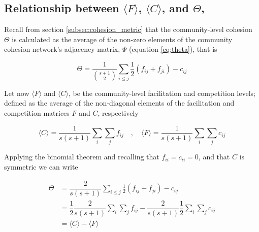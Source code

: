 \documentclass[titlepage,11pt]{article}
\begin{document}
	\subsection{Relationship between $ \langle F \rangle $, $ \langle C \rangle $, and $ \Theta $,}\label{subsec:relationships}
		Recall from section \ref{subsec:cohesion_metric} that the community-level cohesion $ \Theta $ is calculated as the average of the non-zero elements of the community cohesion network's adjacency matrix, $ \Psi $ (equation \ref{eq:theta}), that is
		\begin{linenomath*}
				\begin{equation}
					\Theta = \dfrac{1}{{s+1 \choose 2}} \sum_{i \leq j} \frac12(f_{ij} + f_{ji}) - c_{ij} 
				\end{equation} 
		\end{linenomath*}
		Let now $ \langle F \rangle $ and $ \langle C \rangle $, be the community-level facilitation and competition levels; defined as the average of the non-diagonal elements of the facilitation and competition matrices $ F $ and $ C $, respectively 
		\begin{linenomath*}
			\begin{equation}
				\langle C \rangle = \dfrac{1}{s(s+1)}\sum_i\sum_j f_{ij} \quad , \quad \langle F \rangle = \dfrac{1}{s(s+1)}\sum_i\sum_j c_{ij}
			\end{equation}
		\end{linenomath*}
		Applying the binomial theorem and recalling that $ f_{ii} =  c_{ii} = 0$, and that $ C $ is symmetric we can write
		\begin{linenomath*}
			\begin{align*}
				\Theta	&= \dfrac{2}{s(s+1)} \sum_{i \leq j} \frac12(f_{ij} + f_{ji}) - c_{ij}\\
				&= \dfrac{1}{2} \dfrac{2}{s(s+1)}\sum_i\sum_j f_{ij} - \dfrac{2}{s(s+1)}\dfrac{1}{2}\sum_i\sum_j c_{ij}\\
				&= \langle C \rangle - \langle F \rangle
			\end{align*}
		\end{linenomath*}
\end{document}
